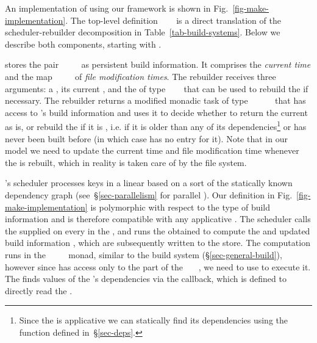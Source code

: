 An implementation of \Make using our framework is shown in
Fig.~\ref{fig-make-implementation}. The top-level definition
~\hs{=}~~ is a direct translation
of the scheduler-rebuilder decomposition in Table~\ref{tab-build-systems}. Below
we describe both components, starting with .

\Make stores the pair ~~\hs{=}~~
as persistent build information. It comprises the \emph{current time} 
and the map ~\hs{::}~~~ of \emph{file
modification times}. The rebuilder receives three arguments: a , its
current , and the  of type
~~~ that can be used to rebuild the
 if necessary. The rebuilder returns a modified monadic task of type
~~~~~ that has
access to \Make's build information and uses it to decide whether to return the
current  as is, or rebuild the  if it is , i.e.
if it is older than any of its dependencies\footnote{Since the  is
applicative we can statically find its dependencies using the function
 defined in~\S\ref{sec-deps}.} or has never been built before
(in which case  has no entry for it). Note that in our model we need
to update the current time and file modification time whenever the  is
rebuilt, which in reality is taken care of by the file system.

\Make's scheduler processes keys in a linear  based on a
 sort of the statically known dependency graph
(see~\S\ref{sec-parallelism} for parallel \Make). Our definition in
Fig.~\ref{fig-make-implementation} is polymorphic with respect to the type of
build information  and is therefore compatible with any applicative
. The scheduler calls the supplied  on every
 in the , and runs the obtained  to compute the
 and updated build information , which are subsequently
written to the store. The computation runs in the
~~~~ monad, similar to the 
build system (\S\ref{sec-general-build}), however since  has access
only to the  part of the ~~~, we need to use
 to execute it. The  finds values of the 's
dependencies via the  callback, which is defined to directly read the
.

